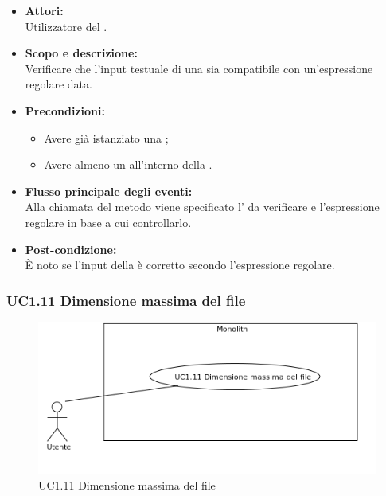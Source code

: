 \begin{itemize}
	\item \textbf{Attori:}
	\\Utilizzatore del .
	\item \textbf{Scopo e descrizione:} 
	\\Verificare che l'input testuale di una  sia compatibile con un'espressione regolare data.
	\item \textbf{Precondizioni:}
	\begin{itemize}
		\item Avere già istanziato una ;
		\item Avere almeno un  all'interno della .
	\end{itemize}
	\item \textbf{Flusso principale degli eventi:}
	\\Alla chiamata del metodo viene specificato l' da verificare e l'espressione regolare in base a cui controllarlo.
	\item \textbf{Post-condizione:}
	\\È noto se l'input della  è corretto secondo l'espressione regolare.
\end{itemize}

\subsubsection{UC1.11 Dimensione massima del file} \label{UC1.11}

\begin{figure}[H]
	\centering
	\includegraphics[width=15cm]{../../documenti/AnalisiDeiRequisiti/Diagrammi_img/uc1_11.png}
	\caption{UC1.11 Dimensione massima del file}
\end{figure}

